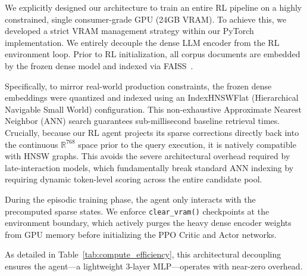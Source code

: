 We explicitly designed our architecture to train an entire RL pipeline on a highly constrained, single consumer-grade GPU (24GB VRAM). To achieve this, we developed a strict VRAM management strategy within our PyTorch~\citep{paszke2019} implementation. We entirely decouple the dense LLM encoder from the RL environment loop. Prior to RL initialization, all corpus documents are embedded by the frozen dense model and indexed via FAISS~\citep{johnson2019}. 

Specifically, to mirror real-world production constraints, the frozen dense embeddings were quantized and indexed using an IndexHNSWFlat (Hierarchical Navigable Small World) configuration. This non-exhaustive Approximate Nearest Neighbor (ANN) search guarantees sub-millisecond baseline retrieval times. Crucially, because our RL agent projects its sparse corrections directly back into the continuous $\mathbb{R}^{768}$ space prior to the query execution, it is natively compatible with HNSW graphs. This avoids the severe architectural overhead required by late-interaction models, which fundamentally break standard ANN indexing by requiring dynamic token-level scoring across the entire candidate pool.

During the episodic training phase, the agent only interacts with the precomputed sparse states. We enforce \texttt{clear\_vram()} checkpoints at the environment boundary, which actively purges the heavy dense encoder weights from GPU memory before initializing the PPO Critic and Actor networks.

As detailed in Table~\ref{tab:compute_efficiency}, this architectural decoupling ensures the agent—a lightweight 3-layer MLP—operates with near-zero overhead.

\begin{table}[htbp]
    \caption{Compute \& VRAM Efficiency}
    \begin{center}
    \end{center}
    \label{tab:compute_efficiency}
\end{table}

